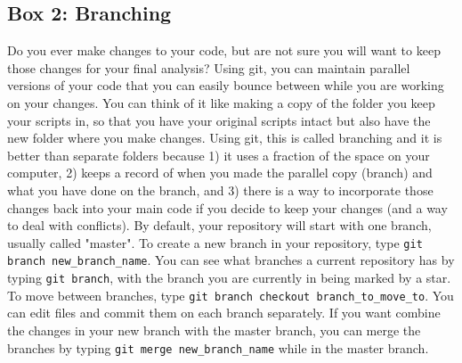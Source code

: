 \subsection{Box 2: Branching}

Do you ever make changes to your code, but are not sure you will want to keep those changes for your final analysis? Using git, you can maintain parallel versions of your code that you can easily bounce between while you are working on your changes. You can think of it like making a copy of the folder you keep your scripts in, so that you have your original scripts intact but also have the new folder where you make changes. Using git, this is called branching and it is better than separate folders because 1) it uses a fraction of the space on your computer, 2) keeps a record of when you made the parallel copy (branch) and what you have done on the branch, and 3) there is a way to incorporate those changes back into your main code if you decide to keep your changes (and a way to deal with conflicts). By default, your repository will start with one branch, usually called "master". To create a new branch in your repository, type \verb|git branch new_branch_name|. You can see what branches a current repository has by typing \verb|git branch|, with the branch you are currently in being marked by a star. To move between branches, type \verb|git branch checkout branch_to_move_to|. You can edit files and commit them on each branch separately. If you want combine the changes in your new branch with the master branch, you can merge the branches by typing \verb|git merge new_branch_name| while in the master branch. 